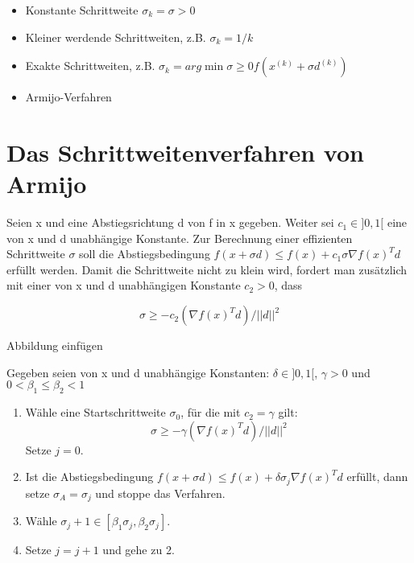 \begin{itemize}
	\item Konstante Schrittweite $\sigma_k = \sigma > 0$
	\item Kleiner werdende Schrittweiten, z.B. $\sigma_k = 1/k$
	\item Exakte Schrittweiten, z.B. $\sigma_k = arg \min {\sigma \geq 0} f(x^{(k)} + \sigma d^{(k)})$
	\item  Armijo-Verfahren
\end{itemize}

\section{Das Schrittweitenverfahren von Armijo}

Seien x und eine Abstiegsrichtung d von f in x gegeben. Weiter sei
$c_1 \in ]0, 1[$ eine von x und d unabhängige Konstante. Zur Berechnung
einer effizienten Schrittweite $\sigma$ soll die Abstiegsbedingung
$f(x + \sigma d) \leq f(x) + c_1 \sigma \nabla f(x)^Td$
erfüllt werden. Damit die Schrittweite nicht zu klein wird, fordert man
zusätzlich mit einer von x und d unabhängigen Konstante $c_2 > 0$, dass

\begin{equation}
\sigma \geq -c_2 (\nabla f(x)^Td) / ||d||^2 
\end{equation}

Abbildung einfügen


Gegeben seien von x und d unabhängige Konstanten:
$\delta \in ]0, 1[$, $\gamma > 0$ und $0 < \beta_1 \leq \beta_2 < 1$

\begin{enumerate}
	\item  Wähle eine Startschrittweite $\sigma_0$, für die mit $c_2 = \gamma$ gilt:
	\begin{equation}
	\sigma \geq - \gamma (\nabla f(x)^Td)/||d||^2
	\end{equation}
	Setze $j = 0$.
	\item Ist die Abstiegsbedingung
	 $f(x + \sigma d) \leq f(x) + \delta \sigma_j \nabla f(x)^Td$
	 erfüllt, dann setze $\sigma_A = \sigma_j$ und stoppe das Verfahren.
	\item Wähle $\sigma_j+ 1 \in [\beta_1 \sigma_j , \beta_2 \sigma_j ]$.
	\item Setze $j = j + 1$ und gehe zu 2.
\end{enumerate}


